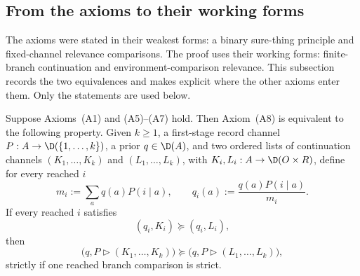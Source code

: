 \subsection{From the axioms to their working forms}

The axioms were stated in their weakest forms: a binary sure-thing principle and fixed-channel relevance
comparisons.  The proof uses their working forms: finite-branch continuation and environment-comparison
relevance.  This subsection records the two equivalences and makes explicit where the other axioms enter
them.  Only the statements are used below.

\begin{lemma}\label{pt:lem:finite-branch-extension}
Suppose Axioms~\textup{(A1)} and \textup{(A5)--(A7)} hold.  Then
Axiom~\textup{(A8)} is equivalent to the following property.  Given
$k\ge1$, a first-stage record channel
$P:A\to\D(\{1,\ldots,k\})$, a prior $q\in\D(A)$, and two ordered lists of
continuation channels $(K_1,\ldots,K_k)$ and $(L_1,\ldots,L_k)$, with
$K_i,L_i:A\to\D(O\times R)$, define for every reached $i$
\[
 m_i:=\sum_aq(a)P(i\mid a),
 \qquad q_i(a):=\frac{q(a)P(i\mid a)}{m_i}.
\]
If every reached $i$ satisfies
\[
 (q_i,K_i)\succeq(q_i,L_i),
\]
then
\begin{equation}
 \bigl(q,P\triangleright(K_1,\ldots,K_k)\bigr)
 \succeq
 \bigl(q,P\triangleright(L_1,\ldots,L_k)\bigr),
 \label{pt:eq:finite-branch-extension}
\end{equation}
strictly if one reached branch comparison is strict.
\end{lemma}

